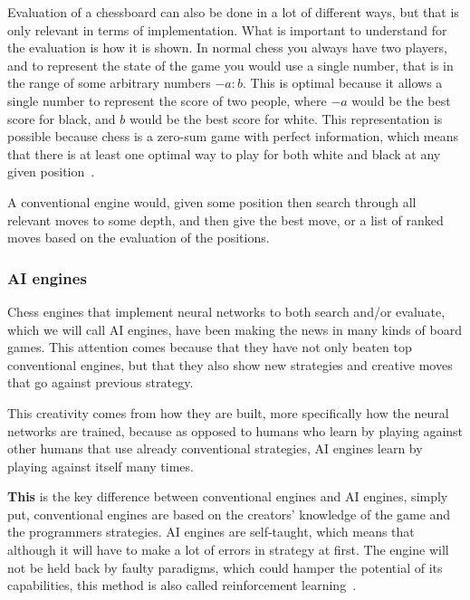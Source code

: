 
Evaluation of a chessboard can also be done in a lot of different ways, but that is only relevant in terms of
implementation.
What is important to understand for the evaluation is how it is shown.
In normal chess you always have two players, and to represent the state of the game you would use a single number,
that is in the range of some arbitrary numbers \( -a : b\).
This is optimal because it allows a single number to represent the score of two people, where \(-a\) would be
the best score for black, and \(b\) would be the best score for white.
This representation is possible because chess is a zero-sum game with perfect information, which means that there is
at least one optimal way to play for both white and black at any given position~\cite{zero-sum-games}.


A conventional engine would, given some position then search through all relevant moves to some depth, and then give
the best move, or a list of ranked moves based on the evaluation of the positions.

\subsubsection{AI engines}\label{subsubsec:ai-engines}

Chess engines that implement neural networks to both search and/or evaluate, which we will call AI engines,
have been making the news in many kinds of board games.
This attention comes because that they have not only beaten top conventional engines,
but that they also show new strategies and creative moves that go against previous strategy.

This creativity comes from how they are built, more specifically how the neural networks are trained, because as opposed
to humans who learn by playing against other humans that use already conventional strategies, AI engines learn by
playing against itself many times.

\textbf{This} is the key difference between conventional engines and AI engines, simply put, conventional
engines are based on the creators' knowledge of the game and the programmers strategies.
AI engines are self-taught, which means that although it will have to make a lot of errors in strategy at first.
The engine will not be held back by faulty paradigms, which could hamper the potential of its
capabilities, this method is also called reinforcement learning~\cite{how-neural-network-engines-work}.

